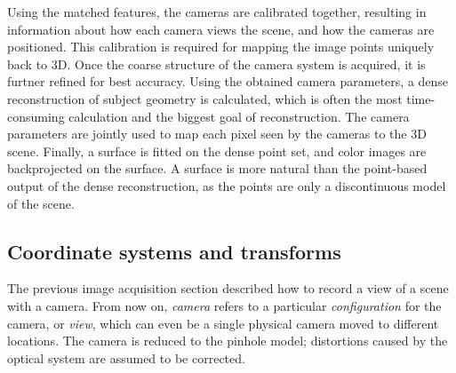 Using the matched features, the cameras are calibrated together, resulting in information about how each camera views the scene, and how the cameras are positioned.
This calibration is required for mapping the image points uniquely back to 3D.
Once the coarse structure of the camera system is acquired, it is furtner refined for best accuracy.
Using the obtained camera parameters, a dense reconstruction of subject geometry is calculated, which is often the most time-consuming calculation and the biggest goal of reconstruction.
The camera parameters are jointly used to map each pixel seen by the cameras to the 3D scene.
Finally, a surface is fitted on the dense point set, and color images are backprojected on the surface.
A surface is more natural than the point-based output of the dense reconstruction, as the points are only a discontinuous model of the scene.





\subsection{Coordinate systems and transforms} \label{sec:coord} %


The previous image acquisition section described how to record a view of a scene with a camera.
From now on, \emph{camera} refers to a particular \emph{configuration} for the camera, or \emph{view}, which can even be a single physical camera moved to different locations.
The camera is reduced to the pinhole model; distortions caused by the optical system are assumed to be corrected.

